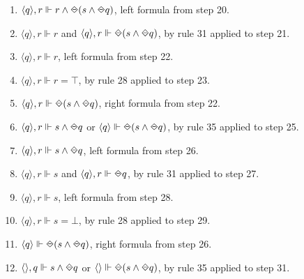 \begin{myEx}
\begin{enumerate}
\item $\langle q \rangle, r \Vdash r \land \LTLonce(s \land \LTLonce q)$, left formula from step 20.\\ %

\item $\langle q \rangle, r \Vdash r$ and $\langle q \rangle, r \Vdash \LTLonce(s \land \LTLonce q)$, by rule 31 applied to step 21.\\ %

\item $\langle q \rangle, r \Vdash r$, left formula from step 22.\\ %

\item $\langle q \rangle, r \Vdash r = \top$, by rule 28 applied to step 23.\\ %

\item $\langle q \rangle, r \Vdash \LTLonce(s \land \LTLonce q)$, right formula from step 22.\\ %

\item $\langle q \rangle, r \Vdash s \land \LTLonce q$ or $\langle q \rangle \Vdash \LTLonce(s \land \LTLonce q)$, by rule 35 applied to step 25.\\ %

\item $\langle q \rangle, r \Vdash s \land \LTLonce q$, left formula from step 26.\\ %

\item $\langle q \rangle, r \Vdash s$ and $\langle q \rangle, r \Vdash \LTLonce q$, by rule 31 applied to step 27.\\ %

\item $\langle q \rangle, r \Vdash s$, left formula from step 28.\\ %

\item $\langle q \rangle, r \Vdash s = \bot$, by rule 28 applied to step 29.\\ %

\item $\langle q \rangle \Vdash \LTLonce(s \land \LTLonce q)$, right formula from step 26.\\ %

\item $\langle \rangle, q \Vdash s \land \LTLonce q$ or $\langle \rangle \Vdash \LTLonce(s \land \LTLonce q)$, by rule 35 applied to step 31.\\ %


\end{enumerate}
\end{myEx}
